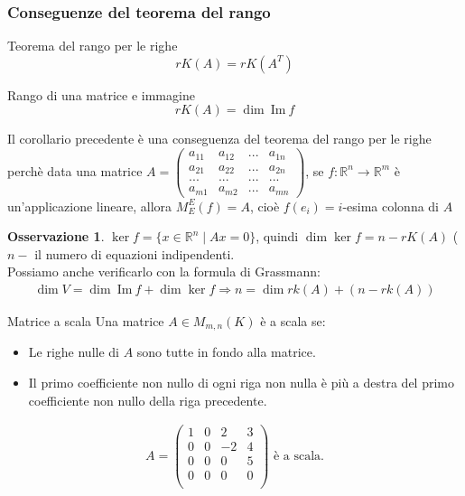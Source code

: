 \documentclass[a4paper]{article}
\newcommand{\IM}{\ \mathrm{Im} \ }
\theoremstyle{definition}
\newtheorem*{oss}{Osservazione}
\begin{document}
\subsubsection{Conseguenze del teorema del rango}
\begin{cor}{Teorema del rango per le righe}{}
	 \[rK(A) = rK(A^T)\]
\end{cor}


\begin{cor}{Rango di una matrice e immagine}{}
	\[rK(A) = \dim \IM f\]
\end{cor}
Il corollario precedente è una conseguenza del teorema del rango per le righe perchè
data una matrice $A = \begin{pmatrix}
		a_{11} & a_{12} & ... & a_{1n} \\
		a_{21} & a_{22} & ... & a_{2n} \\
		...    & ...    & ... & ...    \\
		a_{m1} & a_{m2} & ... & a_{mn}
	\end{pmatrix}$,
se $f:\mathbb{R}^n \rightarrow \mathbb{R}^m$ è un'applicazione lineare, allora $M_E^E(f) = A$, cioè $f(e_i) = i$-esima colonna di $A$

\begin{oss}
	$\ker f = \{x \in \mathbb{R}^n \mid Ax = 0\}$, quindi $\dim \ker f = n - rK(A)$ ($n -$ il numero di equazioni indipendenti. \\
	Possiamo anche verificarlo con la formula di Grassmann:
	\begin{align*}
		\dim V = \dim \IM f + \dim \ker f \Rightarrow n = \dim rk(A) + (n - rk(A))
	\end{align*}
\end{oss}

\begin{deff}{Matrice a scala}{}
	Una matrice $A \in M_{m,n}(K)$ è a scala se:
	\begin{itemize}
		\item Le righe nulle di $A$ sono tutte in fondo alla matrice.
		\item Il primo coefficiente non nullo di ogni riga non nulla è più a destra del primo coefficiente non nullo della riga precedente.
	\end{itemize}

	\begin{align*}
		A = \begin{pmatrix}
			1 & 0 & 2 & 3 \\
			0 & 0 & -2 & 4 \\
			0 & 0 & 0 & 5 \\
			0 & 0 & 0 & 0 \\
		\end{pmatrix} \text{ è a scala.}
	\end{align*}
\end{deff}
\end{document}
